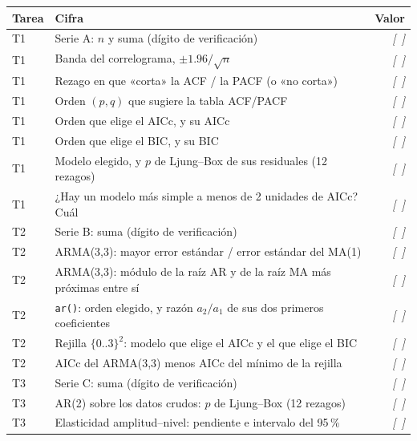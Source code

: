 \documentclass[11pt,a4paper,oneside]{article}
\newcommand{\marcador}[1]{\textcolor{grismarcador}{\textit{[#1]}}}
\begin{document}
\vspace{0.3cm}
\renewcommand{\arraystretch}{1.25}
\begingroup\setlength{\parskip}{0pt}
\begin{tabularx}{\textwidth}{@{}l X r@{}}
\toprule
\textbf{Tarea} & \textbf{Cifra} & \textbf{Valor} \\
\midrule
T1 & Serie A: $n$ y suma (dígito de verificación)                              & \marcador{~} \\
T1 & Banda del correlograma, $\pm 1.96/\sqrt{n}$                              & \marcador{~} \\
T1 & Rezago en que «corta» la ACF / la PACF (o «no corta»)                     & \marcador{~} \\
T1 & Orden $(p,q)$ que sugiere la tabla ACF/PACF                               & \marcador{~} \\
T1 & Orden que elige el AICc, y su AICc                                        & \marcador{~} \\
T1 & Orden que elige el BIC, y su BIC                                          & \marcador{~} \\
T1 & Modelo elegido, y $p$ de Ljung–Box de sus residuales (12 rezagos)         & \marcador{~} \\
T1 & ¿Hay un modelo más simple a menos de 2 unidades de AICc? Cuál            & \marcador{~} \\
\midrule
T2 & Serie B: suma (dígito de verificación)                                    & \marcador{~} \\
T2 & ARMA(3,3): mayor error estándar / error estándar del MA(1)                & \marcador{~} \\
T2 & ARMA(3,3): módulo de la raíz AR y de la raíz MA más próximas entre sí     & \marcador{~} \\
T2 & \texttt{ar()}: orden elegido, y razón $a_2/a_1$ de sus dos primeros coeficientes & \marcador{~} \\
T2 & Rejilla $\{0..3\}^2$: modelo que elige el AICc y el que elige el BIC      & \marcador{~} \\
T2 & AICc del ARMA(3,3) menos AICc del mínimo de la rejilla                    & \marcador{~} \\
\midrule
T3 & Serie C: suma (dígito de verificación)                                    & \marcador{~} \\
T3 & AR(2) sobre los datos crudos: $p$ de Ljung–Box (12 rezagos)               & \marcador{~} \\
T3 & Elasticidad amplitud–nivel: pendiente e intervalo del 95\,\%              & \marcador{~} \\

\end{tabularx}
\end{document}
